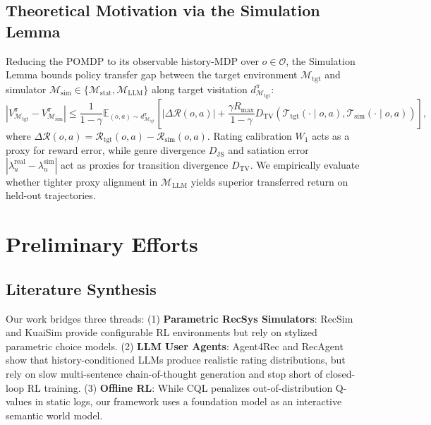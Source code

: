 \documentclass{article}
\begin{document}
\subsection{Theoretical Motivation via the Simulation Lemma}
Reducing the POMDP to its observable history-MDP over $o \in \mathcal{O}$, the Simulation Lemma \cite{kearns2002near} bounds policy transfer gap between the target environment $\mathcal{M}_{\text{tgt}}$ and simulator $\mathcal{M}_{\text{sim}} \in \{\mathcal{M}_{\text{stat}}, \mathcal{M}_{\text{LLM}}\}$ along target visitation $d^{\pi}_{\mathcal{M}_{\text{tgt}}}$:
\begin{equation}
    \left| V^{\pi}_{\mathcal{M}_{\text{tgt}}} - V^{\pi}_{\mathcal{M}_{\text{sim}}} \right| \le \frac{1}{1-\gamma} \mathbb{E}_{(o,a) \sim d^{\pi}_{\mathcal{M}_{\text{tgt}}}} \left[ |\Delta \mathcal{R}(o,a)| + \frac{\gamma R_{\max}}{1-\gamma} D_{\text{TV}}\left(\mathcal{T}_{\text{tgt}}(\cdot \mid o,a), \mathcal{T}_{\text{sim}}(\cdot \mid o,a)\right) \right],
\end{equation}
where $\Delta \mathcal{R}(o, a) = \mathcal{R}_{\text{tgt}}(o,a) - \mathcal{R}_{\text{sim}}(o,a)$. Rating calibration $W_1$ acts as a proxy for reward error, while genre divergence $D_{\text{JS}}$ and satiation error $|\lambda_u^{\text{real}} - \lambda_u^{\text{sim}}|$ act as proxies for transition divergence $D_{\text{TV}}$. We empirically evaluate whether tighter proxy alignment in $\mathcal{M}_{\text{LLM}}$ yields superior transferred return on held-out trajectories.

\section{Preliminary Efforts}

\subsection{Literature Synthesis}
Our work bridges three threads: (1) \textbf{Parametric RecSys Simulators}: RecSim \cite{ie2019recsim} and KuaiSim \cite{gao2022kuairec} provide configurable RL environments but rely on stylized parametric choice models. (2) \textbf{LLM User Agents}: Agent4Rec \cite{zhang2024agent4rec} and RecAgent \cite{wang2024user} show that history-conditioned LLMs produce realistic rating distributions, but rely on slow multi-sentence chain-of-thought generation and stop short of closed-loop RL training. (3) \textbf{Offline RL}: While CQL \cite{kumar2020conservative} penalizes out-of-distribution Q-values in static logs, our framework uses a foundation model as an interactive semantic world model.
\end{document}
